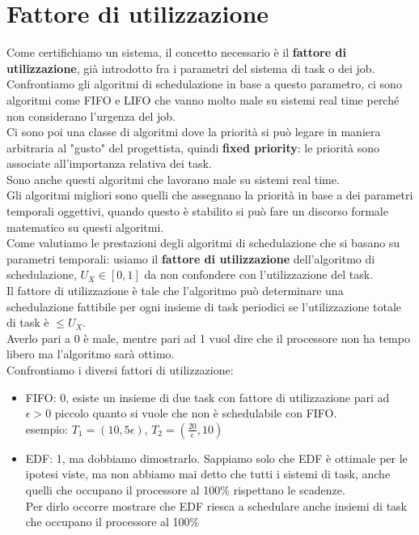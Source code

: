 \documentclass[12pt, oneside]{extbook}
\begin{document}
\section{Fattore di utilizzazione}
Come certifichiamo un sistema, il concetto necessario è il \textbf{fattore di utilizzazione}, già introdotto fra i parametri del sistema di task o dei job.\\
Confrontiamo gli algoritmi di schedulazione in base a questo parametro, ci sono algoritmi come FIFO e LIFO che vanno molto male su sistemi real time perché non considerano l'urgenza del job.\\
Ci sono poi una classe di algoritmi dove la priorità si può legare in maniera arbitraria al "gusto" del progettista, quindi \textbf{fixed priority}: le priorità sono associate all'importanza relativa dei task.\\
Sono anche questi algoritmi che lavorano male su sistemi real time.\\
Gli algoritmi migliori sono quelli che assegnano la priorità in base a dei parametri temporali oggettivi, quando questo è stabilito si può fare un discorso formale matematico su questi algoritmi.\\
Come valutiamo le prestazioni degli algoritmi di schedulazione che si basano su parametri temporali: usiamo il \textbf{fattore di utilizzazione} dell'algoritmo di schedulazione, $U_X \in [0,1]$ da non confondere con l'utilizzazione del task.\\
Il fattore di utilizzazione è tale che l'algoritmo può determinare una schedulazione fattibile per ogni insieme di task periodici se l'utilizzazione totale di task è $\leq U_X$.\\
Averlo pari a 0 è male, mentre pari ad 1 vuol dire che il processore non ha tempo libero ma l'algoritmo sarà ottimo.\\
Confrontiamo i diversi fattori di utilizzazione:
\begin{itemize}
	\item FIFO: 0, esiste un insieme di due task con fattore di utilizzazione pari ad $\epsilon > 0$ piccolo quanto si vuole che non è schedulabile con FIFO.\\esempio: $T_1 = (10, 5\epsilon)$, $T_2 = (\frac{20}{\epsilon}, 10)$
	\item EDF: 1, ma dobbiamo dimostrarlo. Sappiamo solo che EDF è ottimale per le ipotesi viste, ma non abbiamo mai detto che tutti i sistemi di task, anche quelli che occupano il processore al 100\% rispettano le scadenze.\\
	Per dirlo occorre mostrare che EDF riesca a schedulare anche insiemi di task che occupano il processore al 100\%
\end{itemize}
\end{document}
